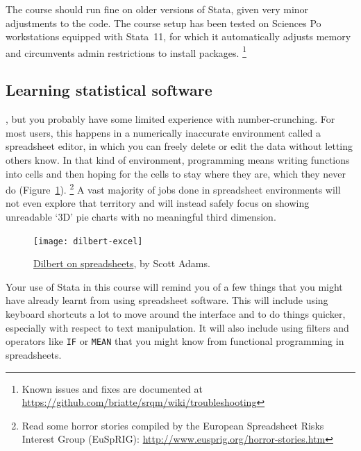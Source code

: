 	The course should run fine on older versions of Stata, given very minor adjustments to the code. The course setup has been tested on Sciences Po workstations equipped with Stata~11, for which it automatically adjusts memory and circumvents admin restrictions to install packages.%
  \footnote{Known issues and fixes are documented at %
		\url{https://github.com/briatte/srqm/wiki/troubleshooting}}%
		
		
%
\subsection{Learning statistical software}%

%
%
, but you probably have some limited experience with number-crunching. For most users, this happens in a numerically inaccurate environment called a spreadsheet editor, in which you can freely delete or edit the data without letting others know. In that kind of environment, programming means writing functions into cells and then hoping for the cells to stay where they are, which they never do (Figure~\ref{fig:dilbert-spreadsheets}).%
	\footnote{Read some horror stories compiled by the European Spreadsheet %
	Risks Interest Group (EuSpRIG): %
	\url{http://www.eusprig.org/horror-stories.htm}} %
	A vast majority of jobs done in spreadsheet environments will not even explore that territory and will instead safely focus on showing unreadable `3D' pie charts with no meaningful third dimension.%

	\begin{figure}
		\texttt{[image: dilbert-excel]}
	  \caption{\href{http://dilbert.com/strips/comic/2007-08-08/}{Dilbert on spreadsheets}, by Scott Adams.}%
	  \label{fig:dilbert-spreadsheets}%
	\end{figure}

Your use of Stata in this course will remind you of a few things that you might have already learnt from using spreadsheet software. This will include using keyboard shortcuts a lot to move around the interface and to do things quicker, especially with respect to text manipulation. It will also include using filters and operators like \texttt{IF} or \texttt{MEAN} that you might know from functional programming in spreadsheets.%

